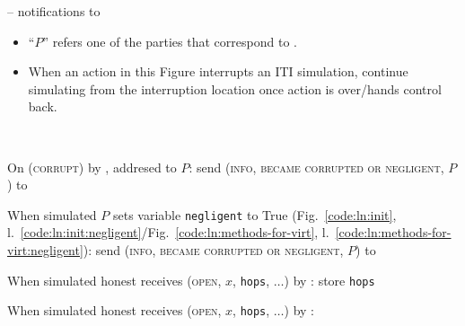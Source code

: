 \begin{center}
  \begin{simulatorbox}{\simulator{} -- notifications to \fchan}
    \begin{itemize}
      \item ``$P$'' refers one of the parties that correspond to \fchan.
      \item When an action in this Figure interrupts an ITI simulation, continue
      simulating from the interruption location once action is over/\fchan hands
      control back.
    \end{itemize} \ \\
    \begin{algorithmic}[1]
      \State On (\textsc{corrupt}) by \adversary, addresed to $P$:
      \label{code:simulator:when-corrupted}
      \Indent
        \State {}
        \State send (\textsc{info}, \textsc{became corrupted or negligent}, $P$)
        to \fchan
        \label{code:simulator:corrupted}
      \EndIndent
      \Statex

      \State When simulated $P$ sets variable \texttt{negligent} to True
      (Fig.~\ref{code:ln:init},
      l.~\ref{code:ln:init:negligent}/Fig.~\ref{code:ln:methods-for-virt},
      l.~\ref{code:ln:methods-for-virt:negligent}):
      \label{code:simulator:when-negligent}
      \Indent
        \State send (\textsc{info}, \textsc{became corrupted or negligent}, $P$)
        to \fchan
        \label{code:simulator:negligent}
      \EndIndent
      \Statex

      \State When simulated honest \alice receives (\textsc{open}, $x$,
      \texttt{hops}, $\dots$) by \environment:
      \Indent
        \State store \texttt{hops} 
      \EndIndent
      \Statex

      \State When simulated honest \bob receives (\textsc{open}, $x$,
      \texttt{hops}, $\dots$) by \alice:
      \Indent
         
      \EndIndent
      \Statex


\end{algorithmic}
\end{simulatorbox}
\end{center}
